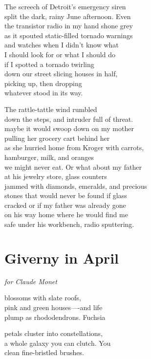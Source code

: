 \documentclass[twoside,10pt]{book}
\begin{document}
The screech of Detroit's emergency siren\\
split the dark, rainy June afternoon. Even\\
the transistor radio in my hand shone grey\\
as it spouted static-filled tornado warnings\\
and watches when I didn't know what\\
I should look for or what I should do\\
if I spotted a tornado twirling\\
down our street slicing houses in half,\\
picking up, then dropping\\
whatever stood in its way.

The rattle-tattle wind rumbled\\
down the steps, and intruder full of threat.\\
maybe it would swoop down on my mother\\
pulling her grocery cart behind her\\
as she hurried home from Kroger with carrots,\\
hamburger, milk, and oranges\\
we might never eat. Or what about my father\\
at his jewelry store, glass counters\\
jammed with diamonds, emeralds, and precious\\
stones that would never be found if glass\\
cracked or if my father was already gone\\
on his way home where he would find me\\
safe under his workbench, radio sputtering.


\clearpage
\section{Giverny in April}

\emph{for Claude Monet}

blossoms with slate roofs,\\
pink and green houses----and life\\
plump as rhododendrons. Fuchsia

petals cluster into constellations,\\
a whole galaxy you can clutch. You\\
clean fine-bristled brushes.
\end{document}
